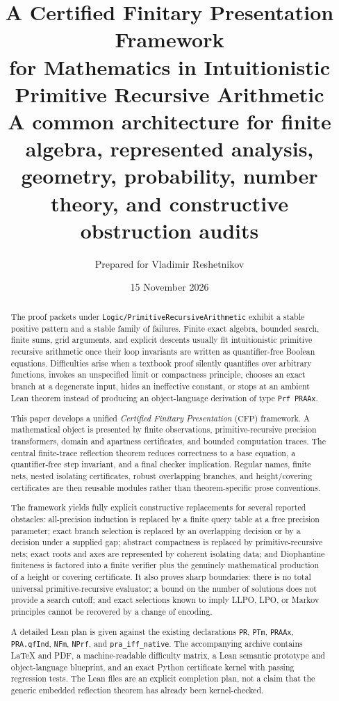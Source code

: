 \documentclass[11pt]{article}
\title{\bfseries A Certified Finitary Presentation Framework\\
for Mathematics in Intuitionistic Primitive Recursive Arithmetic\\[0.5em]
\large A common architecture for finite algebra, represented analysis,\\
geometry, probability, number theory, and constructive obstruction audits}
\author{Prepared for Vladimir Reshetnikov}
\date{15 November 2026}
\theoremstyle{definition}
\newcommand{\CFP}{\mathrm{CFP}}
\newcommand{\code}[1]{\nolinkurl{#1}}
\begin{document}
\maketitle

\begin{abstract}
The proof packets under
\code{Logic/PrimitiveRecursiveArithmetic} exhibit a stable positive pattern
and a stable family of failures.  Finite exact algebra, bounded search, finite
sums, grid arguments, and explicit descents usually fit intuitionistic
primitive recursive arithmetic once their loop invariants are written as
quantifier-free Boolean equations.  Difficulties arise when a textbook proof
silently quantifies over arbitrary functions, invokes an unspecified limit or
compactness principle, chooses an exact branch at a degenerate input, hides an
ineffective constant, or stops at an ambient Lean theorem instead of producing
an object-language derivation of type \code{Prf PRAAx}.

This paper develops a unified \emph{Certified Finitary Presentation} (\(\CFP\))
framework.  A mathematical object is presented by finite observations,
primitive-recursive precision transformers, domain and apartness certificates,
and bounded computation traces.  The central finite-trace reflection theorem
reduces correctness to a base equation, a quantifier-free step invariant, and
a final checker implication.  Regular names, finite nets, nested isolating
certificates, robust overlapping branches, and height/covering certificates
are then reusable modules rather than theorem-specific prose conventions.

The framework yields fully explicit constructive replacements for several
reported obstacles: all-precision induction is replaced by a finite query
table at a free precision parameter; exact branch selection is replaced by an
overlapping decision or by a decision under a supplied gap; abstract
compactness is replaced by primitive-recursive nets; exact roots and axes are
represented by coherent isolating data; and Diophantine finiteness is factored
into a finite verifier plus the genuinely mathematical production of a height
or covering certificate.  It also proves sharp boundaries: there is no total
universal primitive-recursive evaluator; a bound on the number of solutions
does not provide a search cutoff; and exact selections known to imply LLPO,
LPO, or Markov principles cannot be recovered by a change of encoding.

A detailed Lean plan is given against the existing declarations
\code{PR}, \code{PTm}, \code{PRAAx}, \code{PRA.qfInd}, \code{NFm},
\code{NPrf}, and \code{pra_iff_native}.  The accompanying archive contains
LaTeX and PDF, a machine-readable difficulty matrix, a Lean semantic prototype
and object-language blueprint, and an exact Python certificate kernel with
passing regression tests.  The Lean files are an explicit completion plan, not
a claim that the generic embedded reflection theorem has already been
kernel-checked.
\end{abstract}
\end{document}
